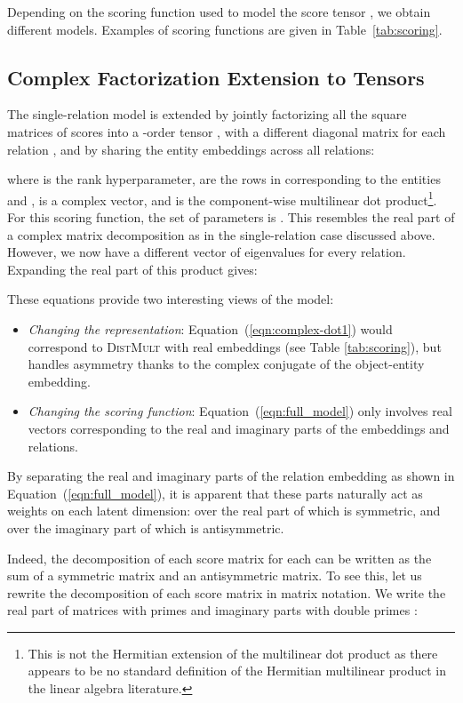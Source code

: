 \documentclass[twoside,11pt]{article}
\begin{document}
Depending on the scoring function  used to model the
score tensor , we obtain different models. Examples of scoring functions are given in Table~\ref{tab:scoring}. 

\subsection{Complex Factorization Extension to Tensors}

The single-relation model is extended by jointly factorizing all 
the square matrices of scores into a -order
tensor , with a different diagonal
matrix  for each relation , and by sharing the entity embeddings  
across all relations:

where  is the rank hyperparameter,
 are the rows in  corresponding to the entities  and , 
 is a complex vector,
and  is the component-wise multilinear 
dot product\footnote{This is not the Hermitian extension of the multilinear 
dot product as there appears to be no standard definition of the Hermitian multilinear product in the linear algebra literature.}.
For this scoring function, the set of parameters  is .
This resembles the real part of a complex matrix decomposition as in the single-relation case discussed above. However, we now have a different vector of eigenvalues for every relation.
Expanding the real part of this product gives:
    


These equations provide two interesting views of the model:
\begin{itemize}
    \item \emph{Changing the representation}: Equation~(\ref{eqn:complex-dot1}) would correspond to \textsc{DistMult} with real embeddings (see Table \ref{tab:scoring}), but handles asymmetry thanks to the complex conjugate of the object-entity embedding.
   
    \item  \emph{Changing the scoring function}: Equation~(\ref{eqn:full_model}) only involves real vectors corresponding to the real and imaginary parts of the embeddings and relations.\end{itemize}


By separating the real and imaginary parts of the relation embedding 
as shown in Equation~(\ref{eqn:full_model}),
it is apparent that these parts naturally act as weights on each latent dimension: 
 over the real part of  which is symmetric, 
and  over the imaginary part
of  which is antisymmetric. 

Indeed, the decomposition of each score matrix  
for each  can be written as
the sum of a symmetric matrix and an antisymmetric matrix.
To see this, let us rewrite the decomposition of each
score matrix  in matrix notation.
We write the real part of matrices with primes  and
imaginary parts with double primes :
\end{document}
